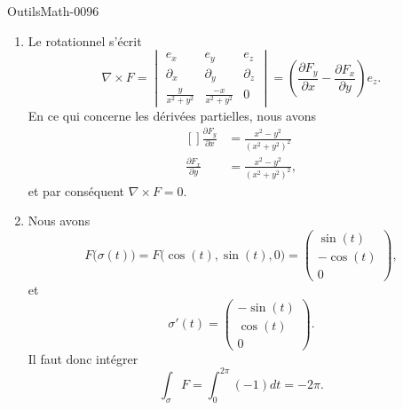 
\begin{corrige}{OutilsMath-0096}

    \begin{enumerate}
        \item
            Le rotationnel s'écrit
            \begin{equation}
                \nabla\times F=\begin{vmatrix}
                    e_x    &   e_y    &   e_z    \\
                    \partial_x    &   \partial_y    &   \partial_z    \\
                    \frac{ y }{ x^2+y^2 }    &   \frac{ -x }{ x^2+y^2 }    &   0
                \end{vmatrix}=\left( \frac{ \partial F_y }{ \partial x }-\frac{ \partial F_x }{ \partial y } \right)e_z.
            \end{equation}
            En ce qui concerne les dérivées partielles, nous avons
            \begin{equation}
                \begin{aligned}[]
                    \frac{ \partial F_y }{ \partial x }&=\frac{ x^2-y^2 }{ (x^2+y^2)^2 }\\
                    \frac{ \partial F_x }{ \partial y }&=\frac{ x^2-y^2 }{ (x^2+y^2)^2 },
                \end{aligned}
            \end{equation}
            et par conséquent $\nabla\times F=0$.
        \item
            Nous avons
            \begin{equation}
                F\big( \sigma(t) \big)=F\big( \cos(t),\sin(t),0 \big)=\begin{pmatrix}
                    \sin(t)    \\ 
                    -\cos(t)    \\ 
                    0    
                \end{pmatrix},
            \end{equation}
            et
            \begin{equation}
                \sigma'(t)=\begin{pmatrix}
                    -\sin(t)    \\ 
                    \cos(t)    \\ 
                    0    
                \end{pmatrix}.
            \end{equation}
            Il faut donc intégrer
            \begin{equation}
                \int_{\sigma}F=\int_0^{2\pi}(-1)dt=-2\pi.
            \end{equation}
            

\end{enumerate}
\end{corrige}
